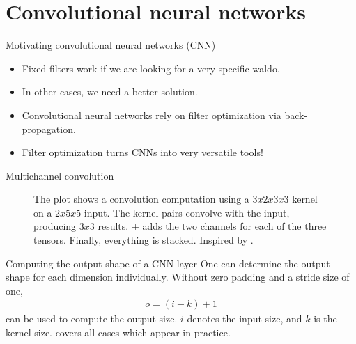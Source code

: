 \documentclass{beamer}
\begin{document}
    \section{Convolutional neural networks}
    \begin{frame}{Motivating convolutional neural networks (CNN)}
        \begin{itemize}
            \item Fixed filters work if we are looking for a very specific waldo.
            \item In other cases, we need a better solution.
            \item Convolutional neural networks rely on filter optimization via back-propagation.
            \item Filter optimization turns CNNs into very versatile tools!
        \end{itemize}
    \end{frame}

    \begin{frame}{Multichannel convolution}
        \begin{figure}
            
            \caption{The plot shows a convolution
            computation using a $3x2x3x3$ kernel on a $2x5x5$ input.
            The kernel pairs convolve with the input, producing $3x3$ results.
            $+$ adds the two channels for each of the three tensors.
            Finally, everything is stacked. Inspired by \cite[page 9]{dumoulin2016guide}. }
        \end{figure}
    \end{frame}

    \begin{frame}{Computing the output shape of a CNN layer}
        One can determine the output shape for each dimension individually.
        Without zero padding and a stride size of one,
        \begin{align}
            o = (i-k) + 1
        \end{align}
        can be used to compute the output size. $i$ denotes the input size,
        and $k$ is the kernel size. \cite{dumoulin2016guide} covers all cases which appear in practice.
    \end{frame}
\end{document}
